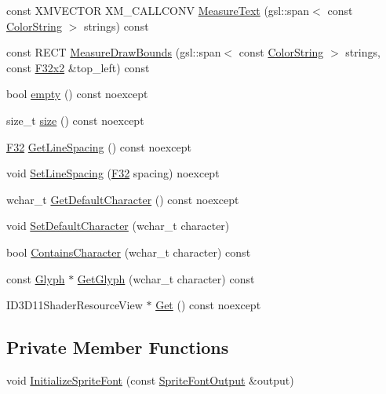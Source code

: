 \begin{DoxyCompactItemize}
\item 
const X\+M\+V\+E\+C\+T\+OR X\+M\+\_\+\+C\+A\+L\+L\+C\+O\+NV \hyperlink{classmage_1_1rendering_1_1_sprite_font_a56471bbeedfa1982f05bf1b9055f74f1}{Measure\+Text} (gsl\+::span$<$ const \hyperlink{classmage_1_1rendering_1_1_color_string}{Color\+String} $>$ strings) const
\item 
const R\+E\+CT \hyperlink{classmage_1_1rendering_1_1_sprite_font_a661820d3d7b20a797966007cd712a76b}{Measure\+Draw\+Bounds} (gsl\+::span$<$ const \hyperlink{classmage_1_1rendering_1_1_color_string}{Color\+String} $>$ strings, const \hyperlink{namespacemage_aa87237ad091f5cd7da612b8523fc108f}{F32x2} \&top\+\_\+left) const
\item 
bool \hyperlink{classmage_1_1rendering_1_1_sprite_font_acc6d1e6ea5d1cb5ca55154a3f4cdc70e}{empty} () const noexcept
\item 
size\+\_\+t \hyperlink{classmage_1_1rendering_1_1_sprite_font_a4f5191f82d228c41b5b6b1ca8215a4b2}{size} () const noexcept
\item 
\hyperlink{namespacemage_aa97e833b45f06d60a0a9c4fc22ae02c0}{F32} \hyperlink{classmage_1_1rendering_1_1_sprite_font_af8a9229b449007440733cdd65d65b2f5}{Get\+Line\+Spacing} () const noexcept
\item 
void \hyperlink{classmage_1_1rendering_1_1_sprite_font_a0dc7afe54ffa5f2215efc739ba8dc2ed}{Set\+Line\+Spacing} (\hyperlink{namespacemage_aa97e833b45f06d60a0a9c4fc22ae02c0}{F32} spacing) noexcept
\item 
wchar\+\_\+t \hyperlink{classmage_1_1rendering_1_1_sprite_font_af50e0ef59bf9d4be7b402c71609de497}{Get\+Default\+Character} () const noexcept
\item 
void \hyperlink{classmage_1_1rendering_1_1_sprite_font_a7400d0574c96e4e204268d6cd5a5c356}{Set\+Default\+Character} (wchar\+\_\+t character)
\item 
bool \hyperlink{classmage_1_1rendering_1_1_sprite_font_a6f9adb6806acc990ac3feaa547f7f296}{Contains\+Character} (wchar\+\_\+t character) const
\item 
const \hyperlink{structmage_1_1rendering_1_1_glyph}{Glyph} $\ast$ \hyperlink{classmage_1_1rendering_1_1_sprite_font_aa56b305252b14f6ecf51738fccb16e93}{Get\+Glyph} (wchar\+\_\+t character) const
\item 
I\+D3\+D11\+Shader\+Resource\+View $\ast$ \hyperlink{classmage_1_1rendering_1_1_sprite_font_ab24067a24942427a39d88ca042da3484}{Get} () const noexcept
\end{DoxyCompactItemize}
\subsection*{Private Member Functions}
\begin{DoxyCompactItemize}
\item 
void \hyperlink{classmage_1_1rendering_1_1_sprite_font_a832f140b987c30ef8f6a3b95afe52711}{Initialize\+Sprite\+Font} (const \hyperlink{structmage_1_1rendering_1_1_sprite_font_output}{Sprite\+Font\+Output} \&output)
\end{DoxyCompactItemize}
